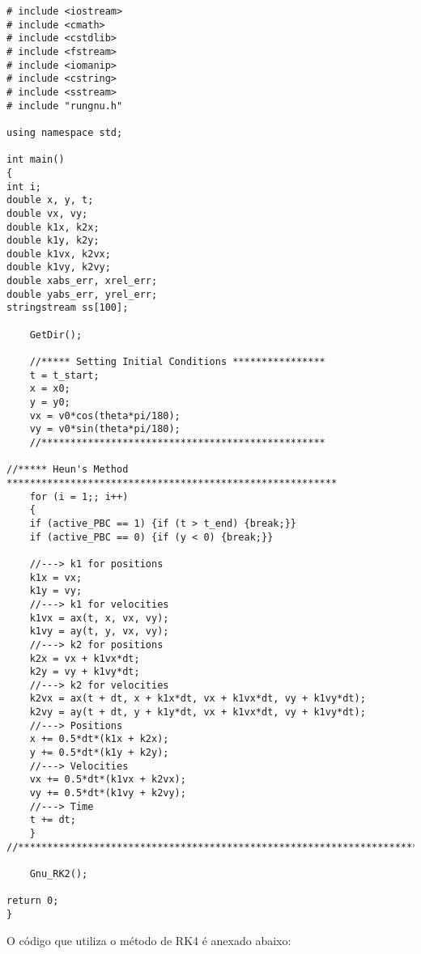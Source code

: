 \documentclass[a4paper, brazilian, 8pt, final]{article}
\begin{document}
\begin{verbatim}
# include <iostream>
# include <cmath>
# include <cstdlib>
# include <fstream>
# include <iomanip>
# include <cstring>
# include <sstream>
# include "rungnu.h"

using namespace std;

int main()
{
int i;
double x, y, t;
double vx, vy;
double k1x, k2x;
double k1y, k2y;
double k1vx, k2vx;
double k1vy, k2vy;
double xabs_err, xrel_err;
double yabs_err, yrel_err;
stringstream ss[100];

	GetDir();

	//***** Setting Initial Conditions ****************
	t = t_start;
	x = x0;
	y = y0;
	vx = v0*cos(theta*pi/180);
	vy = v0*sin(theta*pi/180);
	//*************************************************

//***** Heun's Method *********************************************************	
	for (i = 1;; i++)
	{
	if (active_PBC == 1) {if (t > t_end) {break;}}
	if (active_PBC == 0) {if (y < 0) {break;}}

	//---> k1 for positions
	k1x = vx;
	k1y = vy;
	//---> k1 for velocities 
	k1vx = ax(t, x, vx, vy);
	k1vy = ay(t, y, vx, vy);
	//---> k2 for positions
	k2x = vx + k1vx*dt;
	k2y = vy + k1vy*dt;
	//---> k2 for velocities
	k2vx = ax(t + dt, x + k1x*dt, vx + k1vx*dt, vy + k1vy*dt);
	k2vy = ay(t + dt, y + k1y*dt, vx + k1vx*dt, vy + k1vy*dt);
	//---> Positions 
	x += 0.5*dt*(k1x + k2x);
	y += 0.5*dt*(k1y + k2y);
	//---> Velocities
	vx += 0.5*dt*(k1vx + k2vx);
	vy += 0.5*dt*(k1vy + k2vy);
	//---> Time
	t += dt;
	}
//*****************************************************************************

	Gnu_RK2();

return 0;
}
\end{verbatim}

\quad O código que utiliza o método de RK4 é anexado abaixo:
\end{document}
